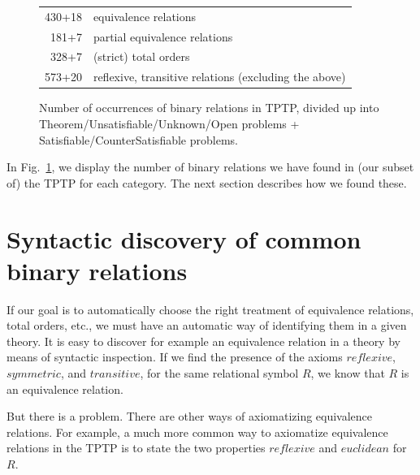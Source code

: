 \documentclass{article}
\newcommand{\Varid}[1]{\mathit{#1}}
\def\comment#1{$\Rightarrow$ {\em #1} $\Leftarrow$}
\begin{document}
\begin{figure}[t]
\begin{center}
\begin{tabular}{rl}
430+18 & equivalence relations \\
181+7 & partial equivalence relations \\
328+7 & (strict) total orders \\
573+20 & reflexive, transitive relations (excluding the above)\\
\end{tabular}
\end{center}
\vspace{-0.5cm}
\caption{Number of occurrences of binary relations in TPTP, divided up into Theorem/Unsatisfiable/Unknown/Open problems + Satisfiable/CounterSatisfiable problems. }
\label{fig:occurs2}
\end{figure}

In Fig.\ \ref{fig:occurs2}, we display the number of binary relations we have found in (our subset of) the TPTP for each category. The next section describes how we found these.


\section{Syntactic discovery of common binary relations} \label{sec:discovery}

If our goal is to automatically choose the right treatment of equivalence relations, total orders, etc., we must have an automatic way of identifying them in a given theory. It is easy to discover for example an equivalence relation in a theory by means of syntactic inspection. If we find the presence of the axioms \ensuremath{\Varid{reflexive}}, \ensuremath{\Varid{symmetric}}, and \ensuremath{\Varid{transitive}}, for the same relational symbol \ensuremath{R}, we know that \ensuremath{R} is an equivalence relation.

But there is a problem. There are other ways of axiomatizing equivalence relations. For example, a much more common way to axiomatize equivalence relations in the TPTP is to state the two properties \ensuremath{\Varid{reflexive}} and \ensuremath{\Varid{euclidean}} for \ensuremath{R}.
\end{document}
